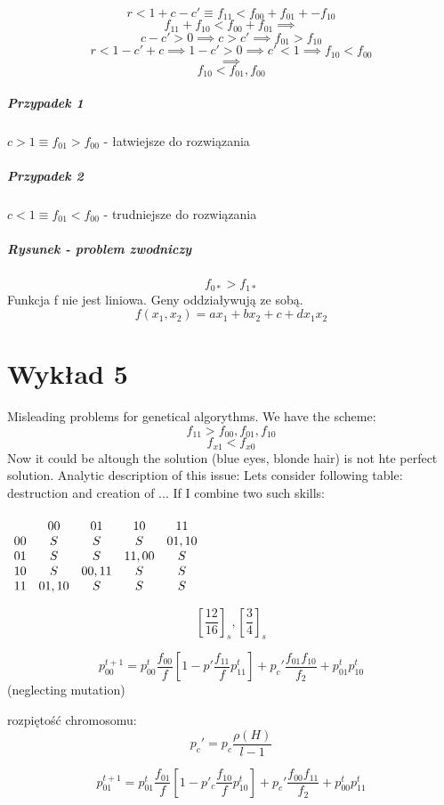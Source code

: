 \documentclass{article}
\begin{document}
			$$r < 1+c-c' \equiv f_{11} < f_{00} + f_{01} + -f_{10}$$	
			$$f_{11}+f_{10}<f_{00}+f_{01} \implies$$
			$$c-c' >0 \implies c>c' \implies f_{01} > f_{10}$$	
			$$r<1-c' + c \implies 1-c'>0 \implies c'<1  \implies f_{10} < f_{00}$$
			$$\implies$$
			$$f_{10}<f_{01}, f_{00}$$			
			\subparagraph{Przypadek 1} $c>1 \equiv f_{01} > f_{00}$ - łatwiejsze do rozwiązania
			\subparagraph{Przypadek 2} $c<1 \equiv f_{01} < f_{00}$ - trudniejsze do rozwiązania
			\subparagraph{Rysunek - problem zwodniczy}
			$$f_{0*}>f_{1*}$$ Funkcja f nie jest liniowa. Geny oddziaływują ze sobą.
			$$f(x_1, x_2)=ax_1 + bx_2 + c + dx_1x_2 $$
		\section{Wykład 5}
			Misleading problems for genetical algorythms. We have the scheme:
			$$f_{11}>f_{00}, f_{01}, f_{10}$$
			$$f_{x1} < f_{x0}$$
			Now it could be altough the solution (blue eyes, blonde hair) is not hte perfect solution.
			Analytic description of this issue: Lets consider following table: destruction and creation of ...
			If I combine two such skills:
			\paragraph{}
			
			\begin{center}
				$\begin{array}{ccccc}
				\centering
				& 00 & 01 & 10 & 11 \\ 
				00 & S & S & S & 01,10 \\ 
				01 & S & S & 11,00 & S \\ 
				10 & S & 00,11 & S & S \\ 
				11 & 01,10 & S & S & S
				\end{array} $
			\end{center}
			
			
			
			
			 $$[\frac{12}{16}]_s, [\frac{3}{4}]_s$$
			 
			$$$$
			$$p_{00}^{t+1}=p^t_{00}\frac{f_{00}}{f}
			[1-p'\frac{f_{11}}{f}p^t_{11}]
			+p_c'\frac{f_{01}f_{10}}{f_2}
			+ p_{01}^tp_{10}^t$$
					(neglecting mutation)
					
			rozpiętość chromosomu:
			$$p_c'=p_c\frac{\rho(H)}{l-1}$$
			
			$$p^{t+1}_{01}=p^t_{01}\frac{f_{01}}{f}
			[1-p'_c\frac{f_{10}}{f}p^t_{10}]
			+p_c'\frac{f_{00}f_{11}}{f_2}
			+ p_{00}^tp_{11}^t$$
			
\end{document}
